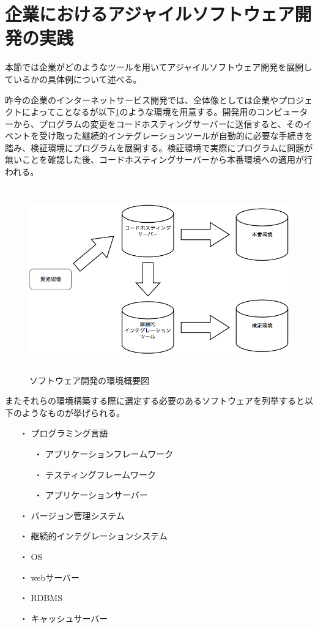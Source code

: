 \section{企業におけるアジャイルソフトウェア開発の実践}

本節では企業がどのようなツールを用いてアジャイルソフトウェア開発を展開しているかの具体例について述べる。

昨今の企業のインターネットサービス開発では、全体像としては企業やプロジェクトによってことなるが以下\ref{fig:dev_env}のような環境を用意する。開発用のコンピューターから、プログラムの変更をコードホスティングサーバーに送信すると、そのイベントを受け取った継続的インテグレーションツールが自動的に必要な手続きを踏み、検証環境にプログラムを展開する。検証環境で実際にプログラムに問題が無いことを確認した後、コードホスティングサーバーから本番環境への適用が行われる。

\begin{figure}[H]
\centering
\includegraphics[height=8cm]{./assets/images/dev_env.png}
\caption{ソフトウェア開発の環境概要図}
\label{fig:dev_env}
\end{figure}

またそれらの環境構築する際に選定する必要のあるソフトウェアを列挙すると以下のようなものが挙げられる。

\begin{itemize}
 \item[・]プログラミング言語
   \begin{itemize}
    \item[・]アプリケーションフレームワーク
    \item[・]テスティングフレームワーク
    \item[・]アプリケーションサーバー
   \end{itemize}
 \item[・]バージョン管理システム
 \item[・]継続的インテグレーションシステム
 \item[・]OS
 \item[・]webサーバー
 \item[・]RDBMS
 \item[・]キャッシュサーバー
\end{itemize}

